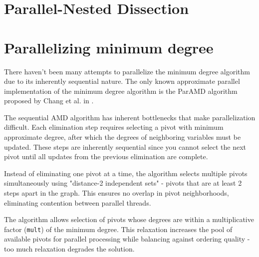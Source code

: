 \newpage
\section{Parallel-Nested Dissection}

\newpage
\section{Parallelizing minimum degree}

There haven't been many attempts to parallelize the minimum degree algorithm due to its inherently sequential nature. The only known approximate parallel implementation of the minimum degree algorithm is the ParAMD algorithm proposed by Chang et al. in \cite{chang2025parallelizingapproximateminimumdegree}. 

The sequential AMD algorithm has inherent bottlenecks that make parallelization difficult. Each elimination step requires selecting a pivot with minimum approximate degree, after which the degrees of neighboring variables must be updated. These steps are inherently sequential since you cannot select the next pivot until all updates from the previous elimination are complete.

Instead of eliminating one pivot at a time, the algorithm selects multiple pivots simultaneously using "distance-2 independent sets" - pivots that are at least 2 steps apart in the graph. This ensures no overlap in pivot neighborhoods, eliminating contention between parallel threads.

The algorithm allows selection of pivots whose degrees are within a multiplicative factor (\texttt{mult}) of the minimum degree. This relaxation increases the pool of available pivots for parallel processing while balancing against ordering quality - too much relaxation degrades the solution.




